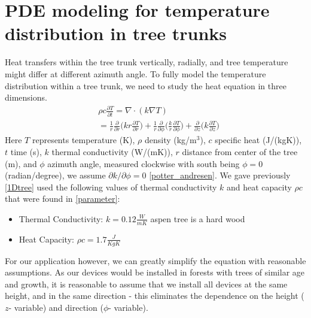 \documentclass{IEEEtran} %
\begin{document}
\section{PDE modeling for temperature distribution in tree trunks}
Heat transfers within the tree trunk vertically, radially, and tree temperature might differ at different azimuth angle. To fully model the temperature distribution within a tree trunk, we need to study the heat equation in three dimensions. 
\begin{align}
&\rho c \frac{\partial T}{\partial t}=\nabla\cdot(k\nabla T)\nonumber\\%
&=\frac{1}{r}\frac{\partial}{\partial r}\bigg(kr\frac{\partial T}{\partial r}\bigg)+\frac{1}{r}\frac{\partial}{\partial \phi}\bigg(\frac{k}{r}\frac{\partial T}{\partial \phi}\bigg)+\frac{\partial}{\partial z}\bigg(k\frac{\partial T}{\partial z}\bigg)\label{heat3d}%
\end{align}
Here $T$ represents temperature (K), $\rho$ density (kg/m$^3$), $c$ specific heat (J/(kgK)), $t$ time (s), $k$ thermal conductivity (W/(mK)), $r$ distance from center of the tree (m), and $\phi$ azimuth angle, measured clockwise with south being $\phi=0$ (radian/degree), we assume $\partial k/\partial \phi=0$ \ref{potter_andresen}. 
We gave previously \ref{1Dtree} used the following values of thermal conductivity $k$ and heat capacity $\rho c$ that were found in \ref{parameter}:
\begin{itemize}
    \item Thermal Conductivity: $k = 0.12 \frac{W}{mK}$ {\bluep aspen tree is a hard wood}
    \item Heat Capacity: $\rho c = 1.7 \frac{J}{KgK}$
\end{itemize}

For our application however, we can greatly simplify the equation with reasonable assumptions. As our devices would be installed in forests with trees of similar age and growth, it is reasonable to assume that we install all devices at the same height, and in the same direction - this eliminates the dependence on the height ($z$- variable) and direction ($\phi$- variable). 
\end{document}
